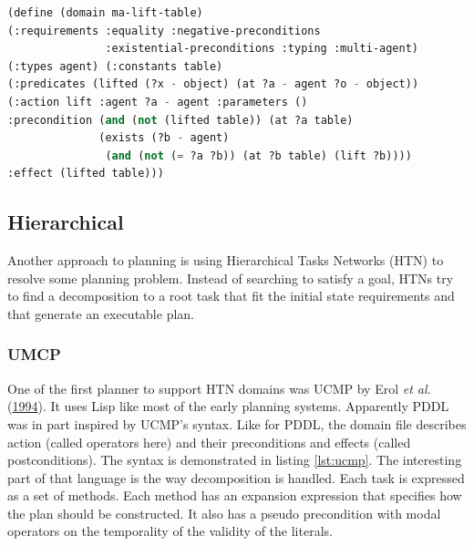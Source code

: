 \documentclass[11pt,a4paper,twoside,openright,titlepage,numbers=noenddot,headinclude,cleardoublepage=empty,openany]{scrreprt}
\theoremstyle{plain}
\theoremstyle{definition}
\theoremstyle{remark}
\begin{document}
\begin{lstlisting}[language=Lisp, caption={Example of MA-PDDL syntax by Kovacs.}, escapechar={$}, label=lst:ma-pddl]
(define (domain ma-lift-table)
(:requirements :equality :negative-preconditions 
               :existential-preconditions :typing :multi-agent) 
(:types agent) (:constants table)
(:predicates (lifted (?x - object) (at ?a - agent ?o - object))
(:action lift :agent ?a - agent :parameters ()
:precondition (and (not (lifted table)) (at ?a table) 
              (exists (?b - agent)
               (and (not (= ?a ?b)) (at ?b table) (lift ?b)))) 
:effect (lifted table)))
\end{lstlisting}

\hypertarget{hierarchical}{%
\subsection{Hierarchical}\label{hierarchical}}

Another approach to planning is using Hierarchical Tasks Networks (HTN)
to resolve some planning problem. Instead of searching to satisfy a
goal, HTNs try to find a decomposition to a root task that fit the
initial state requirements and that generate an executable plan.

\hypertarget{umcp}{%
\subsubsection{UMCP}\label{umcp}}

One of the first planner to support HTN domains was UCMP by Erol
\emph{et al.} (\protect\hyperlink{ref-erol_umcp_1994}{1994}). It uses
Lisp like most of the early planning systems. Apparently PDDL was in
part inspired by UCMP's syntax. Like for PDDL, the domain file describes
action (called operators here) and their preconditions and effects
(called postconditions). The syntax is demonstrated in
listing \ref{lst:ucmp}. The interesting part of that language is the way
decomposition is handled. Each task is expressed as a set of methods.
Each method has an expansion expression that specifies how the plan
should be constructed. It also has a pseudo precondition with modal
operators on the temporality of the validity of the literals.
\end{document}

